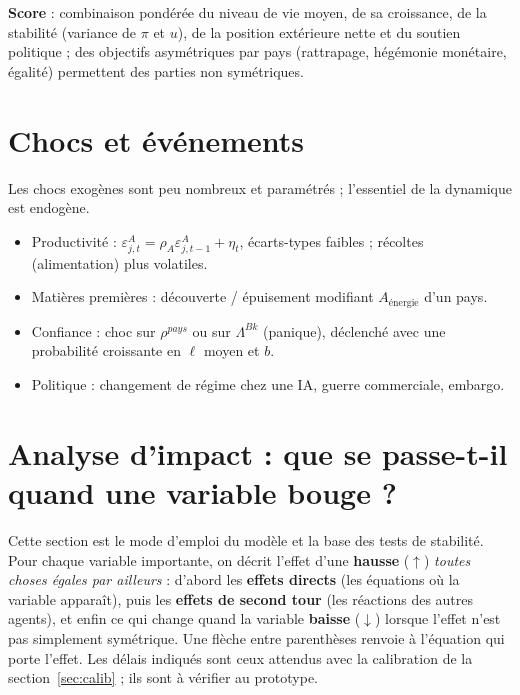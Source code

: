 \documentclass[11pt,a4paper]{article}
\newcommand{\up}{$\uparrow$}
\newcommand{\dn}{$\downarrow$}
\begin{document}
\textbf{Score} : combinaison pondérée du niveau de vie moyen, de sa croissance, de la stabilité (variance de $\pi$ et $u$), de la position extérieure nette et du soutien politique ; des objectifs asymétriques par pays (rattrapage, hégémonie monétaire, égalité) permettent des parties non symétriques.

\section{Chocs et événements}
Les chocs exogènes sont peu nombreux et paramétrés ; l'essentiel de la dynamique est endogène.
\begin{itemize}
\item Productivité : $\varepsilon^A_{j,t} = \rho_A \varepsilon^A_{j,t-1} + \eta_t$, écarts-types faibles ; récoltes (alimentation) plus volatiles.
\item Matières premières : découverte / épuisement modifiant $A_{\text{énergie}}$ d'un pays.
\item Confiance : choc sur $\rho^{pays}$ ou sur $\Lambda^{Bk}$ (panique), déclenché avec une probabilité croissante en $\ell$ moyen et $b$.
\item Politique : changement de régime chez une IA, guerre commerciale, embargo.
\end{itemize}

\section{Analyse d'impact : que se passe-t-il quand une variable bouge ?}
\label{sec:impacts}
Cette section est le mode d'emploi du modèle et la base des tests de stabilité. Pour chaque variable importante, on décrit l'effet d'une \textbf{hausse} (\up) \emph{toutes choses égales par ailleurs} : d'abord les \textbf{effets directs} (les équations où la variable apparaît), puis les \textbf{effets de second tour} (les réactions des autres agents), et enfin ce qui change quand la variable \textbf{baisse} (\dn) lorsque l'effet n'est pas simplement symétrique. Une flèche entre parenthèses renvoie à l'équation qui porte l'effet. Les délais indiqués sont ceux attendus avec la calibration de la section~\ref{sec:calib} ; ils sont à vérifier au prototype.
\end{document}

